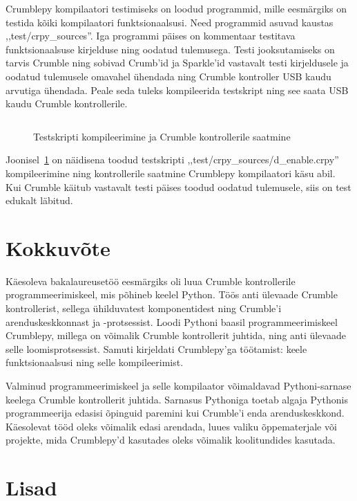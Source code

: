 \documentclass[12pt]{article}
\begin{document}
Crumblepy kompilaatori testimiseks on loodud programmid, mille eesmärgiks on testida kõiki kompilaatori funktsionaalsusi. Need programmid asuvad kaustas \hbox{,,test/crpy\_sources''}. Iga programmi päises on kommentaar testitava funktsionaalsuse kirjelduse ning oodatud tulemusega. Testi jooksutamiseks on tarvis Crumble ning sobivad Crumb'id ja Sparkle'id vastavalt testi kirjeldusele ja oodatud tulemusele omavahel ühendada ning Crumble kontroller USB kaudu arvutiga ühendada. Peale seda tuleks kompileerida testskript ning see saata USB kaudu Crumble kontrollerile. 

\begin{figure}[!ht]
	\inputminted{text}{testing-example.txt}
	\caption{Testskripti kompileerimine ja Crumble kontrollerile saatmine}
	\label{testing-example}
\end{figure}

Joonisel~\ref{testing-example} on näidisena toodud testskripti \hbox{,,test/crpy\_sources/d\_enable.crpy''} kompileerimine ning kontrollerile saatmine Crumblepy kompilaatori käsu abil. Kui Crumble käitub vastavalt testi päises toodud oodatud tulemusele, siis on test edukalt läbitud.

\section*{Kokkuvõte}
Käesoleva bakalaureusetöö eesmärgiks oli luua Crumble kontrollerile programmeerimiskeel, mis põhineb keelel Python. Töös anti ülevaade Crumble kontrollerist, sellega ühilduvatest komponentidest ning Crumble'i arenduskeskkonnast ja -protsessist. Loodi Pythoni baasil programmeerimiskeel Crumblepy, millega on võimalik Crumble kontrollerit juhtida, ning anti ülevaade selle loomisprotsessist. Samuti kirjeldati Crumblepy'ga töötamist: keele funktsionaalsusi ning selle kompileerimist.

Valminud programmeerimiskeel ja selle kompilaator võimaldavad Pythoni-sarnase keelega Crumble kontrollerit juhtida. Sarnasus Pythoniga toetab algaja Pythonis programmeerija edasisi õpinguid paremini kui Crumble'i enda arenduskeskkond. Käesolevat tööd oleks võimalik edasi arendada, luues valiku õppematerjale või projekte, mida Crumblepy'd kasutades oleks võimalik koolitundides kasutada.

\printbibliography[heading=bibintoc,title={Viidatud kirjandus}]
\section*{Lisad}
\setcounter{section}{0}
\end{document}
